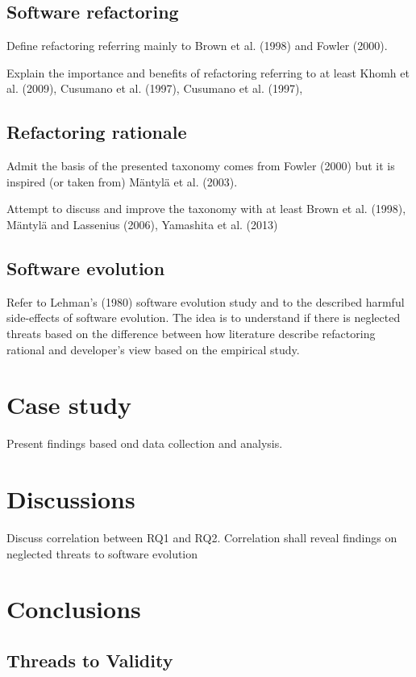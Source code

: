 \documentclass[english,12pt,a4paper,pdftex,sci,utf8]{aaltothesis}
\begin{document}
\subsection{Software refactoring}
Define refactoring referring mainly to Brown et al. (1998) and Fowler (2000). 

Explain the importance and benefits of refactoring referring to at least Khomh et al. (2009), Cusumano et al. (1997), Cusumano et al. (1997),  

\subsection{Refactoring rationale}
Admit the basis of the presented taxonomy comes from Fowler (2000) but it is inspired (or taken from) Mäntylä et al. (2003). 

Attempt to discuss and improve the taxonomy with at least Brown et al. (1998), Mäntylä and Lassenius (2006), Yamashita et al. (2013)
\subsection{Software evolution}
Refer to Lehman's (1980) software evolution study and to the described harmful side-effects of software evolution. The idea is to understand if there is neglected threats based on the difference between how literature describe refactoring rational and developer's view based on the empirical study.


\section{Case study} \label{case study}
Present findings based ond data collection and analysis.


\section{Discussions} \label{discussions}
Discuss correlation between RQ1 and RQ2. Correlation shall reveal findings on neglected threats to software evolution
\section{Conclusions} \label{conclusions}
\subsection{Threads to Validity} \label{validity}
\end{document}
